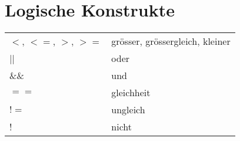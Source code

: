 \section{Logische Konstrukte}

\begin{center}
	\begin{tabular}{ ll } 
		$<$, $<=$, $>$, $>=$ & grösser, grössergleich, kleiner\\
		|| & oder\\
		\&\& & und\\
		$==$ & gleichheit\\
		$!=$ &ungleich\\
		! & nicht\\
		
	\end{tabular}
\end{center}


























